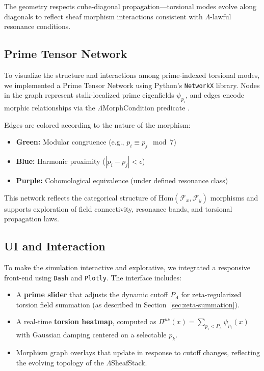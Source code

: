 \documentclass{article}
\theoremstyle{plain}
\begin{document}
The geometry respects cube-diagonal propagation—torsional modes evolve along diagonals to reflect sheaf morphism interactions consistent with $\Lambda$-lawful resonance conditions.

\subsection{Prime Tensor Network}

To visualize the structure and interactions among prime-indexed torsional modes, we implemented a Prime Tensor Network using Python’s \texttt{NetworkX} library. Nodes in the graph represent stalk-localized prime eigenfields $\psi_{p_i}$, and edges encode morphic relationships via the $\Lambda$MorphCondition predicate \cite{vanGelder2025Multiplicity,vanGelder2025PIRTM}.

Edges are colored according to the nature of the morphism:

\begin{itemize}
  \item \textbf{Green:} Modular congruence (e.g., $p_i \equiv p_j \mod 7$)
  \item \textbf{Blue:} Harmonic proximity ($|p_i - p_j| < \epsilon$)
  \item \textbf{Purple:} Cohomological equivalence (under defined resonance class)
\end{itemize}

This network reflects the categorical structure of $\text{Hom}(\mathcal{F}_x, \mathcal{F}_y)$ morphisms and supports exploration of field connectivity, resonance bands, and torsional propagation laws.

\subsection{UI and Interaction}

To make the simulation interactive and explorative, we integrated a responsive front-end using \texttt{Dash} and \texttt{Plotly}. The interface includes:

\begin{itemize}
  \item A \textbf{prime slider} that adjusts the dynamic cutoff $P_\Lambda$ for zeta-regularized torsion field summation (as described in Section~\ref{sec:zeta-summation}).
  \item A real-time \textbf{torsion heatmap}, computed as $\Pi^{\mu\nu}(x) = \sum_{p_i < P_\Lambda} \psi_{p_i}(x)$ with Gaussian damping centered on a selectable $p_k$.
  \item Morphism graph overlays that update in response to cutoff changes, reflecting the evolving topology of the $\Lambda$SheafStack.
\end{itemize}
\end{document}
